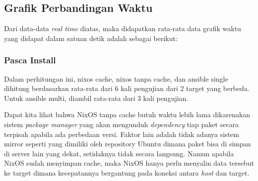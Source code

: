 \documentclass[10pt,]{report}
\begin{document}
\begin{adjustwidth}{20pt}{}
	\subsection{Grafik Perbandingan Waktu}
	\begin{adjustwidth}{20pt}{}
		Dari data-data \textit{real time} diatas, maka didapatkan
		rata-rata data grafik waktu yang didapat dalam satuan
		detik adalah sebagai berikut:
	\end{adjustwidth}
	\subsubsection{Pasca Install}
	\begin{adjustwidth}{20pt}{}
		Dalam perhitungan ini, nixos cache, nixos tanpa cache, dan ansible single
		dihitung berdasarkan rata-rata dari 6 kali pengujian dari 2 target yang berbeda.
		Untuk ansible multi, diambil rata-rata dari 3 kali pengujian.
	\end{adjustwidth}
	\begin{adjustwidth}{20pt}{}
		Dapat kita lihat bahwa NixOS tanpa cache butuh waktu lebih lama dikarenakan
		sistem \textit{package manager} yang akan mengunduh \textit{dependency} tiap
		paket secara terpisah apabila ada perbedaan versi. Faktor lain adalah
		tidak adanya sistem mirror seperti yang dimiliki oleh
		repository Ubuntu dimana paket bisa di simpan di server lain yang dekat, setidaknya
		tidak secara langsung.
		Namun apabila NixOS sudah menyimpan cache, maka NixOS hanya perlu menyalin
		data tersebut ke target dimana kecepatannya bergantung pada koneksi antara
		\textit{host} dan target.
	\end{adjustwidth}

\end{adjustwidth}
\end{document}
